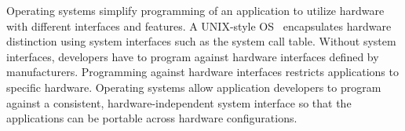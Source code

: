 \label{chap:intro}

Operating systems simplify programming of an application to utilize hardware with different interfaces and features.
A UNIX-style OS~\cite{ritchie74unix}
encapsulates hardware distinction using system interfaces such as the system call table.
Without system interfaces,
developers have to program against hardware interfaces defined by manufacturers.
Programming against hardware interfaces
restricts applications to 
specific hardware.
Operating systems allow application developers to program against a consistent, hardware-independent
system interface %
so that the applications can be portable
across hardware configurations.













